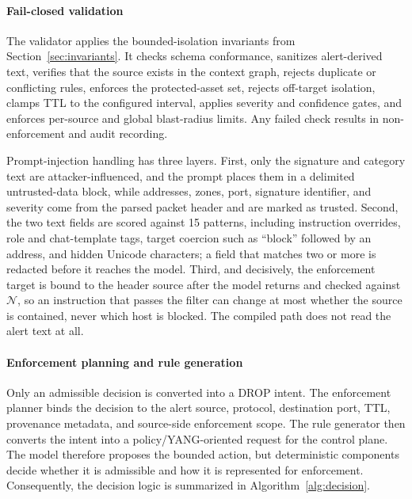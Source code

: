 \documentclass[final,5p]{elsarticle}
\begin{document}
\paragraph{Fail-closed validation}
The validator applies the bounded-isolation invariants from Section~\ref{sec:invariants}. It checks schema conformance, sanitizes alert-derived text, verifies that the source exists in the context graph, rejects duplicate or conflicting rules, enforces the protected-asset set, rejects off-target isolation, clamps TTL to the configured interval, applies severity and confidence gates, and enforces per-source and global blast-radius limits. Any failed check results in non-enforcement and audit recording.

Prompt-injection handling has three layers. First, only the signature and category text are attacker-influenced, and the prompt places them in a delimited untrusted-data block, while addresses, zones, port, signature identifier, and severity come from the parsed packet header and are marked as trusted. Second, the two text fields are scored against 15 patterns, including instruction overrides, role and chat-template tags, target coercion such as ``block'' followed by an address, and hidden Unicode characters; a field that matches two or more is redacted before it reaches the model. Third, and decisively, the enforcement target is bound to the header source after the model returns and checked against $\mathcal{N}$, so an instruction that passes the filter can change at most whether the source is contained, never which host is blocked. The compiled path does not read the alert text at all.

\paragraph{Enforcement planning and rule generation}
Only an admissible decision is converted into a DROP intent. The enforcement planner binds the decision to the alert source, protocol, destination port, TTL, provenance metadata, and source-side enforcement scope. The rule generator then converts the intent into a policy/YANG-oriented request for the control plane. The model therefore proposes the bounded action, but deterministic components decide whether it is admissible and how it is represented for enforcement. Consequently, the decision logic is summarized in Algorithm~\ref{alg:decision}.
\end{document}

